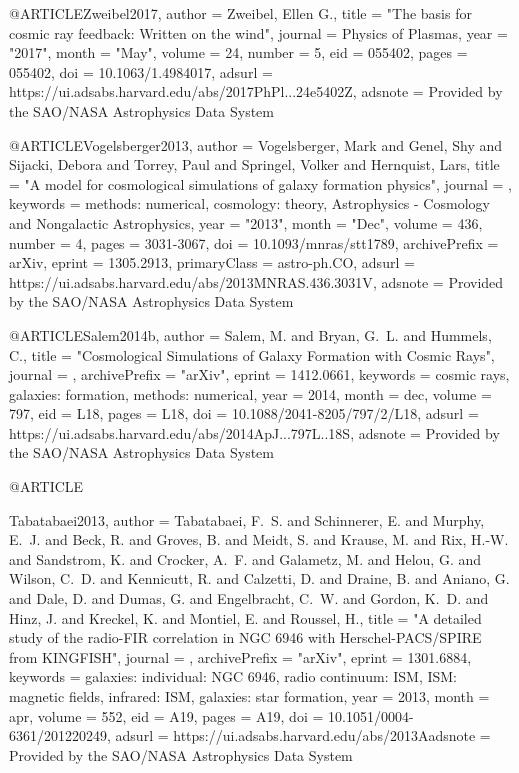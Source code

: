 \documentclass[useAMS,usenatbib]{mnras}
\begin{document}
{{@ARTICLE{Zweibel2017,
       author = {{Zweibel}, Ellen G.},
        title = "{The basis for cosmic ray feedback: Written on the wind}",
      journal = {Physics of Plasmas},
         year = "2017",
        month = "May",
       volume = {24},
       number = {5},
          eid = {055402},
        pages = {055402},
          doi = {10.1063/1.4984017},
       adsurl = {https://ui.adsabs.harvard.edu/abs/2017PhPl...24e5402Z},
      adsnote = {Provided by the SAO/NASA Astrophysics Data System}
}

@ARTICLE{Vogelsberger2013,
       author = {{Vogelsberger}, Mark and {Genel}, Shy and {Sijacki}, Debora and
         {Torrey}, Paul and {Springel}, Volker and {Hernquist}, Lars},
        title = "{A model for cosmological simulations of galaxy formation physics}",
      journal = {\mnras},
     keywords = {methods: numerical, cosmology: theory, Astrophysics - Cosmology and Nongalactic Astrophysics},
         year = "2013",
        month = "Dec",
       volume = {436},
       number = {4},
        pages = {3031-3067},
          doi = {10.1093/mnras/stt1789},
archivePrefix = {arXiv},
       eprint = {1305.2913},
 primaryClass = {astro-ph.CO},
       adsurl = {https://ui.adsabs.harvard.edu/abs/2013MNRAS.436.3031V},
      adsnote = {Provided by the SAO/NASA Astrophysics Data System}
}

@ARTICLE{Salem2014b,
   author = {{Salem}, M. and {Bryan}, G.~L. and {Hummels}, C.},
    title = "{Cosmological Simulations of Galaxy Formation with Cosmic Rays}",
  journal = {\apjl},
archivePrefix = "arXiv",
   eprint = {1412.0661},
 keywords = {cosmic rays, galaxies: formation, methods: numerical},
     year = 2014,
    month = dec,
   volume = 797,
      eid = {L18},
    pages = {L18},
      doi = {10.1088/2041-8205/797/2/L18},
   adsurl = {https://ui.adsabs.harvard.edu/abs/2014ApJ...797L..18S},
  adsnote = {Provided by the SAO/NASA Astrophysics Data System}
}

@ARTICLE{Tabatabaei2013,
   author = {{Tabatabaei}, F.~S. and {Schinnerer}, E. and {Murphy}, E.~J. and 
	{Beck}, R. and {Groves}, B. and {Meidt}, S. and {Krause}, M. and 
	{Rix}, H.-W. and {Sandstrom}, K. and {Crocker}, A.~F. and {Galametz}, M. and 
	{Helou}, G. and {Wilson}, C.~D. and {Kennicutt}, R. and {Calzetti}, D. and 
	{Draine}, B. and {Aniano}, G. and {Dale}, D. and {Dumas}, G. and 
	{Engelbracht}, C.~W. and {Gordon}, K.~D. and {Hinz}, J. and 
	{Kreckel}, K. and {Montiel}, E. and {Roussel}, H.},
    title = "{A detailed study of the radio-FIR correlation in NGC 6946 with Herschel-PACS/SPIRE from KINGFISH}",
  journal = {\aap},
archivePrefix = "arXiv",
   eprint = {1301.6884},
 keywords = {galaxies: individual: NGC 6946, radio continuum: ISM, ISM: magnetic fields, infrared: ISM, galaxies: star formation},
     year = 2013,
    month = apr,
   volume = 552,
      eid = {A19},
    pages = {A19},
      doi = {10.1051/0004-6361/201220249},
   adsurl = {https://ui.adsabs.harvard.edu/abs/2013Aadsnote = {Provided by the SAO/NASA Astrophysics Data System}
}

}}}
\end{document}
